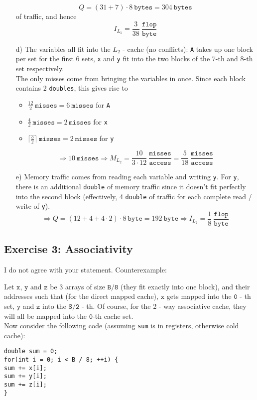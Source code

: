 \documentclass[11pt]{article}
\newcommand{\type}{~\mathtt}
\begin{document}
\begin{itemize}
		\[ Q = (31 + 7) \cdot 8 \type{bytes} = 304 \type{bytes} \]
		of traffic, and hence
		\[ I_{L_1} = \frac{3}{38} \type{\frac{flop}{byte}} \]
		\item[d)] The variables all fit into the $L_2$ - cache (no conflicts): \texttt{A} takes up one block per set for the first 6 sets, \texttt{x} and \texttt{y} fit into the two blocks of the 7-th and 8-th set respectively. \\
		The only misses come from bringing the variables in once. Since each block contains 2 \texttt{doubles}, this gives rise to 
		\begin{itemize}
			\item $\frac{12}{2} \type{misses} = 6 \type{misses}$ for \texttt{A}
			\item $\frac{4}{2} \type{misses} = 2 \type{misses}$ for \texttt{x}
			\item $\lceil\frac{3}{2}\rceil \type{misses} = 2 \type{misses}$ for \texttt{y}
		\end{itemize}
		\[ \Rightarrow 10 \type{misses} \Rightarrow M_{L_2} = \frac{10}{3\cdot 12} \type{\frac{misses}{access}} = \frac{5}{18}\type{\frac{misses}{access}} \]
		\item[e)] Memory traffic comes from reading each variable and writing \texttt{y}. For \texttt{y}, there is an additional \texttt{double} of memory traffic since it doesn't fit perfectly into the second block (effectively, 4 \texttt{double} of traffic for each complete read / write of \texttt{y}).
		\[ \Rightarrow Q = (12 + 4 + 4\cdot 2) \cdot 8 \type{byte} = 192 \type{byte} \Rightarrow I_{L_2} = \frac{1}{8}\type{\frac{flop}{byte}} \]
	\end{itemize}

\subsection*{Exercise 3: Associativity}
	I do not agree with your statement. Counterexample: \par 
	Let $\mathtt{x}$, $\mathtt{y}$ and $\mathtt{z}$ be 3 arrays of size $\mathtt{B / 8}$ (they fit exactly into one block), and their addresses such that (for the direct mapped cache), $\mathtt{x}$ gets mapped into the $\mathtt{0}$ - th set, $\mathtt{y}$ and $\mathtt{z}$ into the $\mathtt{S / 2}$ - th. Of course, for the 2 - way associative cache, they will all be mapped into the $\mathtt{0}$-th cache set.\\
	Now consider the following code (assuming \texttt{sum} is in registers, otherwise cold cache):
	\begin{tabbing} 
		\=\texttt{double sum = 0;}\\
		\>\texttt{for(int i = 0; i < B / 8; ++i) \{ }\\
		\>\hspace*{1cm} \= \texttt{sum += x[i];}\\
		\> \> \texttt{sum += y[i];}\\
		\> \> \texttt{sum += z[i];}\\
		\> \texttt{\}}
	\end{tabbing}
	
\end{document}

